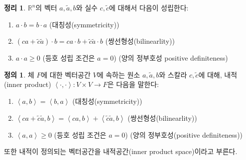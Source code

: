 \documentclass[unfonts,oneside,a4paper]{oblivoir}
\theoremstyle{definition}
\newtheorem{definition}{정의}[section]
\theoremstyle{theorem}
\newtheorem{theorem}{정리}[section]
\theoremstyle{theorem}
\theoremstyle{remark}
\theoremstyle{remark}
\theoremstyle{remark}
\theoremstyle{remark}
\renewcommand{\vec}[1]{\bm{\mathit{#1}}}
\newcommand{\vecz}{\bm{\mathrm{0}}}
\begin{document}
\begin{theorem}
    $\mathbb R^n$의 벡터 $\vec a, \tilde{\vec a}, \vec b$와 실수 $c, \tilde c$에 대해서 다음이 성립한다:
    \begin{enumerate}
        \item $\vec a \cdot \vec b = \vec b \cdot \vec a$ (대칭성(symmetricity))
        \item $(c \vec a + \tilde c \tilde{\vec a}) \cdot \vec b = c \vec a \cdot \vec b + \tilde c \tilde{\vec a} \cdot \vec b$ (쌍선형성(bilinearlity))
        \item $\vec a \cdot \vec a \geq 0$ (등호 성립 조건은 $\vec a = \vecz$) (양의 정부호성 positive definiteness)
    \end{enumerate}
\end{theorem}

\begin{definition}
    체 $F$에 대한 벡터공간 $V$에 속하는 원소 $\vec a, \tilde{\vec a}, \vec b$와 스칼라 $c, \tilde c$에 대해, 내적(inner product) $\left<\cdot, \cdot\right>: V \times V \rightarrow F$은 다음을 말한다:
    \begin{enumerate}
        \item $\left<\vec a, \vec b\right> = \left<\vec b, \vec a\right>$ (대칭성(symmetricity))
        \item $\left<c \vec a + \tilde c \tilde{\vec a}, \vec b\right> = \left<c \vec a, \vec b\right> + \left<\tilde c \tilde{\vec a}, \vec b\right>$ (쌍선형성(bilinearlity))
        \item $\left<\vec a, \vec a\right> \geq 0$ (등호 성립 조건은 $\vec a = \vecz$) (양의 정부호성(positive definiteness))
    \end{enumerate}
    또한 내적이 정의되는 벡터공간을 내적공간(inner product space)이라고 부른다.
\end{definition}
\end{document}
